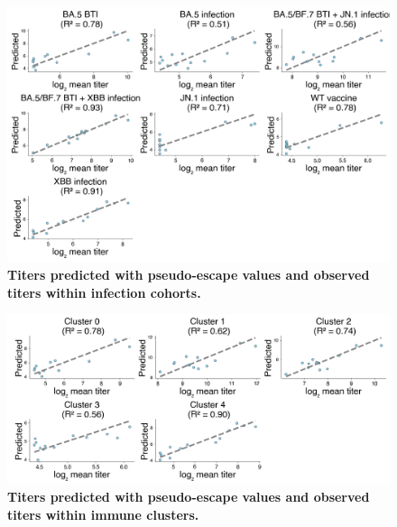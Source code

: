 \documentclass[11pt,oneside,letterpaper]{article}
\begin{document}
\begin{figure}[t!]
    \centering
    \includegraphics[width=1.0\textwidth=0.01]{./supplementary_figures/groupwise_titer_correlation_immune_group.png}
    \caption{
        \textbf{Titers predicted with pseudo-escape values and observed titers within infection cohorts.}
    }
    \label{fig:titer_pseudo-escape_correlations_by_immune_group}
\end{figure}

\begin{figure}[t!]
    \centering
    \includegraphics[width=1.0\textwidth=0.01]{./supplementary_figures/groupwise_titer_correlation_immune_cluster.png}
    \caption{
        \textbf{Titers predicted with pseudo-escape values and observed titers within immune clusters.}
    }
    \label{fig:titer_pseudo-escape_correlations_by_immune_cluster}
\end{figure}
\end{document}
